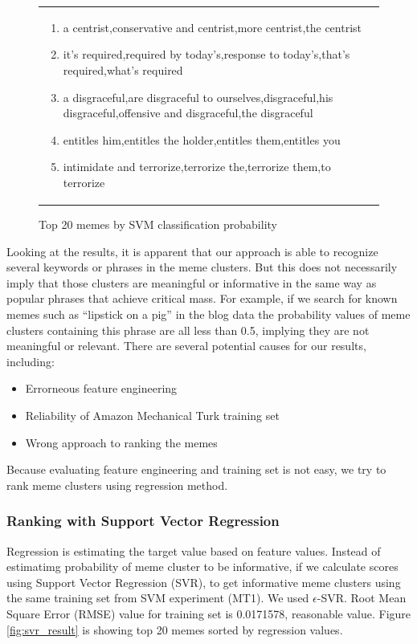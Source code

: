 \documentclass{sig-alternate}
\begin{document}
\begin{figure}[h]
\begin{center}
{\begin{tabular}{p{8cm}}
\begin{enumerate}
\item a centrist,conservative and centrist,more centrist,the centrist
\item it's required,required by today's,response to today's,that's required,what's required
\item a disgraceful,are disgraceful to ourselves,disgraceful,his disgraceful,offensive and disgraceful,the disgraceful
\item entitles him,entitles the holder,entitles them,entitles you
\item intimidate and terrorize,terrorize the,terrorize them,to terrorize
\end{enumerate}

\end{tabular}
}
\caption{Top 20 memes by SVM classification probability}
\label{fig:svm_result}
\end{center}
\end{figure}

Looking at the results, it is apparent that our approach is able to recognize several keywords or phrases in the meme clusters.  But this does not necessarily imply that those clusters are meaningful or informative in the same way as popular phrases that achieve critical mass. For example, if  we search for known memes such as  ``lipstick on a pig'' in the blog data the probability values of meme clusters containing this phrase are all less than 0.5, implying they are not meaningful or relevant. There are several potential causes for our results, including:
\begin{itemize}
 \item Errorneous feature engineering
 \item Reliability of Amazon Mechanical Turk training set
 \item Wrong approach to ranking the memes
\end{itemize}

Because evaluating feature engineering and training set is not easy, we try to rank meme clusters using regression method.



\subsubsection{Ranking with Support Vector Regression}
Regression is estimating the target value based on feature values. Instead of estimatimg probability of meme cluster to be informative, if we calculate scores using Support Vector Regression (SVR), to get informative meme clusters using the same training set from SVM experiment (MT1). We used $\epsilon$-SVR. Root Mean Square Error (RMSE) value for training set is 0.0171578, reasonable value. Figure \ref{fig:svr_result} is showing top 20 memes sorted by regression values.
\end{document}
